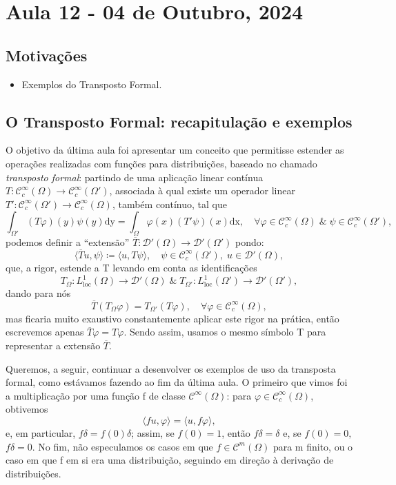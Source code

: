 \documentclass[../distribution_theory_notes.tex]{subfiles}
\begin{document}
\section{Aula 12 - 04 de Outubro, 2024}
\subsection{Motivações}
\begin{itemize}
	\item Exemplos do Transposto Formal.
\end{itemize}
\subsection{O Transposto Formal: recapitulação e exemplos}
O objetivo da última aula foi apresentar um conceito que permitisse estender as operações realizadas com funções para distribuições, baseado no chamado \textit{transposto formal}: partindo de uma
aplicação linear contínua \(T:\mathcal{C}_{c}^{\infty}(\Omega )\rightarrow \mathcal{C}_{c}^{\infty}(\Omega ')\), associada à qual existe um operador linear \(T':\mathcal{C}_{c}^{\infty}(\Omega' )\rightarrow \mathcal{C}_{c}^{\infty}(\Omega )\), também contínuo, tal que
\[
	\int_{\Omega '}^{} (T\varphi )(y)\psi (y) \mathrm{dy} = \int_{\Omega }^{}\varphi (x)(T'\psi )(x) \mathrm{dx},\quad \forall \varphi \in \mathcal{C}_{c}^{\infty}(\Omega )\;\&\; \psi \in \mathcal{C}_{c}^{\infty}(\Omega '),
\]
podemos definir a ``extensão'' \(\overline{T}:\mathcal{D}'(\Omega )\rightarrow \mathcal{D}'(\Omega ') \) pondo:
\[
	\langle \overline{T}u, \psi  \rangle\coloneqq \langle u, T\psi  \rangle, \quad \psi \in \mathcal{C}_{c}^{\infty}(\Omega '),\; u\in \mathcal{D}'(\Omega ),
\]
que, a rigor, estende a T levando em conta as identificações
\[
	T_{\Omega }: L_{\mathrm{loc}}^{1}(\Omega )\rightarrow \mathcal{D}'(\Omega) \;\&\; T_{\Omega'}:L_{\mathrm{loc}}^{1}(\Omega')\rightarrow \mathcal{D}'(\Omega '),
\]
dando para nós
\[
	\overline{T}(T_{\Omega }\varphi )= T_{\Omega'}(T\varphi ),\quad \forall \varphi \in \mathcal{C}_{c}^{\infty}(\Omega ),
\]
mas ficaria muito exaustivo constantemente aplicar este rigor na prática, então escrevemos apenas \(\overline{T}\varphi = T\varphi \). Sendo assim, usamos o mesmo símbolo T para representar a extensão \(\overline{T}.\)

Queremos, a seguir, continuar a desenvolver os exemplos de uso da transposta formal, como estávamos fazendo ao fim da última aula. O primeiro que vimos foi a multiplicação por uma função f de classe \(\mathcal{C}^{\infty}(\Omega )\): para \(\varphi \in \mathcal{C}_{c}^{\infty}(\Omega )\), obtivemos
\[
	\langle f u, \varphi  \rangle=\langle u, f \varphi  \rangle,
\]
e, em particular, \(f\delta =f(0)\delta \); assim, se \(f(0)=1\), então \(f\delta =\delta \) e, se \(f(0)=0,\) \(f\delta =0.\) No fim, não especulamos os casos em que \(f\in \mathcal{C}^{m}(\Omega )\) para m finito, ou o caso em que f em si era uma distribuição, seguindo em direção à derivação de distribuições.
\end{document}
